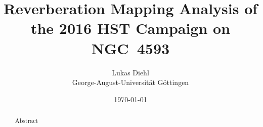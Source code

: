 \documentclass[a4paper,12pt]{report}
\title{\textbf{Reverberation Mapping Analysis of the 2016 HST Campaign on NGC 4593}}
\author{Lukas Diehl \\ George-August-Universität Göttingen}
\date{\today}
\begin{document}
	
	\maketitle
	\thispagestyle{empty}
	\newpage
	
	\begin{abstract}
		Abstract
	\end{abstract}
	\newpage
	
	\tableofcontents
	\newpage
	
	\listoffigures
	\listoftables
	\newpage
	
	
	
	
	
	
	
	
	\printbibliography
	\appendix
	
	
\end{document}
